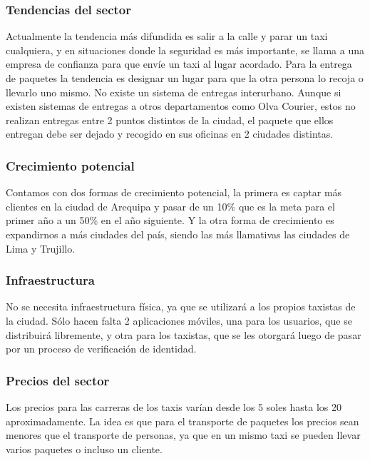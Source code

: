 \subsubsection{Tendencias del sector}
Actualmente la tendencia más difundida es salir a la calle y parar un taxi cualquiera, y en situaciones donde la seguridad es más importante, se llama a una empresa de confianza para que envíe un taxi al lugar acordado. Para la entrega de paquetes la tendencia es designar un lugar para que la otra persona lo recoja o llevarlo uno mismo. No existe un sistema de entregas interurbano. Aunque si existen sistemas de entregas a otros departamentos como Olva Courier, estos no realizan entregas entre 2 puntos distintos de la ciudad, el paquete que ellos entregan debe ser dejado y recogido en sus oficinas en 2 ciudades distintas.


\subsubsection{Crecimiento potencial}
Contamos con dos formas de crecimiento potencial, la primera es captar más clientes en la ciudad de Arequipa y pasar de un 10\% que es la meta para el primer año a un 50\% en el año siguiente. Y la otra forma de crecimiento es expandirnos a más ciudades del país, siendo las más llamativas las ciudades de Lima y Trujillo.

\subsubsection{Infraestructura}
No se necesita infraestructura física, ya que se utilizará a los propios taxistas de la ciudad. Sólo hacen falta 2 aplicaciones móviles, una para los usuarios, que se distribuirá libremente, y otra para los taxistas, que se les otorgará luego de pasar por un proceso de verificación de identidad.

\subsubsection{Precios del sector}
Los precios para las carreras de los taxis varían desde los 5 soles hasta los 20 aproximadamente. La idea es que para el transporte de paquetes los precios sean menores que el transporte de personas, ya que en un mismo taxi se pueden llevar varios paquetes o incluso un cliente.

